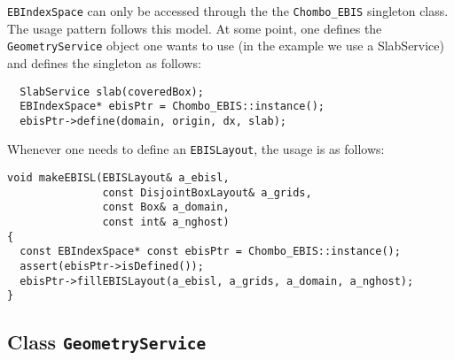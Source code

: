 {\tt EBIndexSpace} can only be accessed through the the
\verb/Chombo_EBIS/ singleton class.  The usage pattern
follows this model.  At some point, one defines the
{\tt GeometryService} object one wants to use (in
the example we use a SlabService) and defines
the singleton  as follows:
\begin{verbatim}
  SlabService slab(coveredBox);
  EBIndexSpace* ebisPtr = Chombo_EBIS::instance();
  ebisPtr->define(domain, origin, dx, slab);
\end{verbatim}
Whenever one needs to define an {\tt EBISLayout}, the usage
is as follows:
\begin{verbatim}
void makeEBISL(EBISLayout& a_ebisl, 
               const DisjointBoxLayout& a_grids, 
               const Box& a_domain, 
               const int& a_nghost)
{
  const EBIndexSpace* const ebisPtr = Chombo_EBIS::instance();
  assert(ebisPtr->isDefined());
  ebisPtr->fillEBISLayout(a_ebisl, a_grids, a_domain, a_nghost);
}
\end{verbatim}

\subsection{Class {\tt GeometryService}}
\label{sec::geometryservice}

